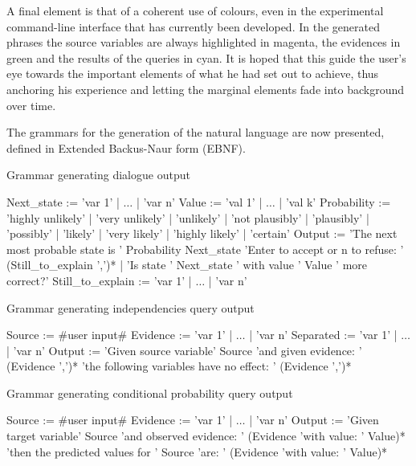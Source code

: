 A final element is that of a coherent use of colours, even in the experimental command-line interface that has currently been developed.
In the generated phrases the source variables are always highlighted in magenta, the evidences in green and the results of the queries in cyan.
It is hoped that this guide the user's eye towards the important elements of what he had set out to achieve, thus anchoring his experience and letting the marginal elements fade into background over time.

The grammars for the generation of the natural language are now presented, defined in Extended Backus-Naur form (EBNF).

\begin{algorithm}[htp!]
	\caption{Grammar generating dialogue output}
	\label{alg:nl-dialogue}
	\begin{algorithmic}[1]
		\State Next\_state := 'var 1' | $\ldots$ |  'var n'
		\State Value := 'val 1' | $\ldots$ |  'val k'
		\State Probability := 'highly unlikely' | 'very unlikely' | 'unlikely' | 'not plausibly' | 'plausibly' | 'possibly' | 'likely' | 'very likely' | 'highly likely' | 'certain'
		\State Output := 'The next most probable state is ' Probability Next\_state 'Enter to accept or n to refuse: ' (Still\_to\_explain ',')* | 'Is state ' Next\_state ' with value ' Value ' more correct?' 
		\State Still\_to\_explain := 'var 1' | $\ldots$ |  'var n'
	\end{algorithmic}
\end{algorithm}

\begin{algorithm}[htp!]
	\caption{Grammar generating independencies query output}
	\label{alg:nl-independencies}
	\begin{algorithmic}[1]
		\State Source := \#user input\#
		\State Evidence := 'var 1' | $\ldots$ |  'var n'
		\State Separated := 'var 1' | $\ldots$ |  'var n'
		\State Output := 'Given source variable' Source 'and given evidence: '  (Evidence ',')* 'the following variables have no effect: ' (Evidence ',')*
	\end{algorithmic}
\end{algorithm}

\begin{algorithm}[htp!]
	\caption{Grammar generating conditional probability query output}
	\label{alg:nl-conditional}
	\begin{algorithmic}[1]
		\State Source := \#user input\#
		\State Evidence := 'var 1' | $\ldots$ |  'var n'
		\State Output := 'Given target variable' Source 'and observed evidence: ' (Evidence 'with value: ' Value)* 'then the predicted values for ' Source 'are: ' (Evidence 'with value: ' Value)*
	\end{algorithmic}
\end{algorithm}


